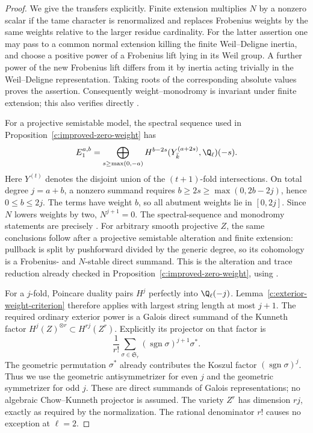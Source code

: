 \begin{proof}
We give the transfers explicitly.  Finite extension multiplies
$N$ by a nonzero scalar if the tame character is renormalized
and replaces Frobenius weights by the same weights relative to
the larger residue cardinality.  For the latter assertion one
may pass to a common normal extension killing the finite
Weil--Deligne inertia, and choose a positive power of a
Frobenius lift lying in its Weil group.  A further power of the
new Frobenius lift differs from it by inertia acting trivially
in the Weil--Deligne representation.  Taking roots of the
corresponding absolute values proves the assertion.
Consequently weight--monodromy is invariant under finite
extension; this also verifies directly
\citet[Lemma~1.4(2)]{c_tayloryoshida2007}.

For a projective semistable model, the spectral sequence used
in Proposition~\ref{c:improved-zero-weight} has
\[
 E_1^{a,b}=
 \bigoplus_{s\geq\max(0,-a)}
 H^{b-2s}(Y^{(a+2s)}_{\bar k},\Q_\ell)(-s).
\]
Here $Y^{(t)}$ denotes the disjoint union of the $(t+1)$-fold
intersections.  On total degree $j=a+b$, a nonzero summand
requires
$b\geq2s\geq\max(0,2b-2j)$, hence $0\leq b\leq2j$.
The terms have weight $b$, so all abutment weights lie in
$[0,2j]$.  Since $N$ lowers weights by two,
$N^{j+1}=0$.  The spectral-sequence and monodromy statements
are precisely \citet[Satz~2.10 and (2.11), pp.~40--41]{c_rapoportzink1982}.
For arbitrary smooth projective $Z$, the same conclusions
follow after a projective semistable alteration and finite
extension: pullback is split by pushforward divided by the
generic degree, so its cohomology is a Frobenius- and
$N$-stable direct summand.  This is the alteration and trace
reduction already checked in Proposition~\ref{c:improved-zero-weight},
using \citet[Theorem~6.5, pp.~83--86]{c_dejong1996}.

For a $j$-fold, Poincare duality pairs $H^j$ perfectly into
$\Q_\ell(-j)$.  Lemma~\ref{c:exterior-weight-criterion}
therefore applies with largest string length at most $j+1$.
The required ordinary exterior power is a Galois direct
summand of the Kunneth factor
$H^j(Z)^{\otimes r}\subset H^{rj}(Z^r)$.  Explicitly its
projector on that factor is
\[
 \frac1{r!}\sum_{\sigma\in\mathfrak S_r}
       (\operatorname{sgn}\sigma)^{j+1}\sigma^*.
\]
The geometric permutation $\sigma^*$ already contributes
the Koszul factor $(\operatorname{sgn}\sigma)^j$.
Thus we use the geometric antisymmetrizer for even $j$ and
the geometric symmetrizer for odd $j$.  These are direct
summands of Galois representations; no algebraic
Chow--Kunneth projector is assumed.  The variety $Z^r$ has
dimension $rj$, exactly as required by the normalization.
The rational denominator $r!$ causes no exception at $\ell=2$.


\end{proof}
